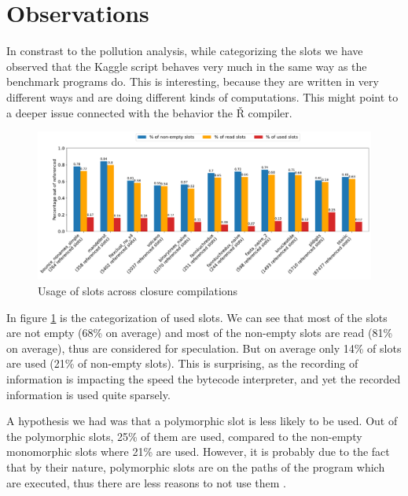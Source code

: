 \section{Observations}


In constrast to the pollution analysis, while categorizing the slots we have observed that the Kaggle script behaves very much in the same way as the benchmark programs do. This is interesting, because they are written in very different ways and are doing different kinds of computations. This might point to a deeper issue connected with the behavior the Ř compiler.

\begin{figure}[t]
	\centering
	\begin{adjustwidth}{-3cm}{-3cm}
		\includegraphics[width=1.5\textwidth]{figures/usage_overall.pdf}
	\end{adjustwidth}
	\caption{Usage of slots across closure compilations}\label{fig:graph-overview}
\end{figure}

In figure \ref{fig:graph-overview} is the categorization of used slots. We can see that most of the slots are not empty (68\% on average) and most of the non-empty slots are read (81\% on average), thus are considered for speculation. But on average only 14\% of slots are used (21\% of non-empty slots). This is surprising, as the recording of information is impacting the speed the bytecode interpreter, and yet the recorded information is used quite sparsely.

A hypothesis we had was that a polymorphic slot is less likely to be used. Out of the polymorphic slots, 25\% of them are used, compared to the non-empty monomorphic slots where 21\% are used. However, it is probably due to the fact that by their nature, polymorphic slots are on the paths of the program which are executed, thus there are less reasons to not use them .

